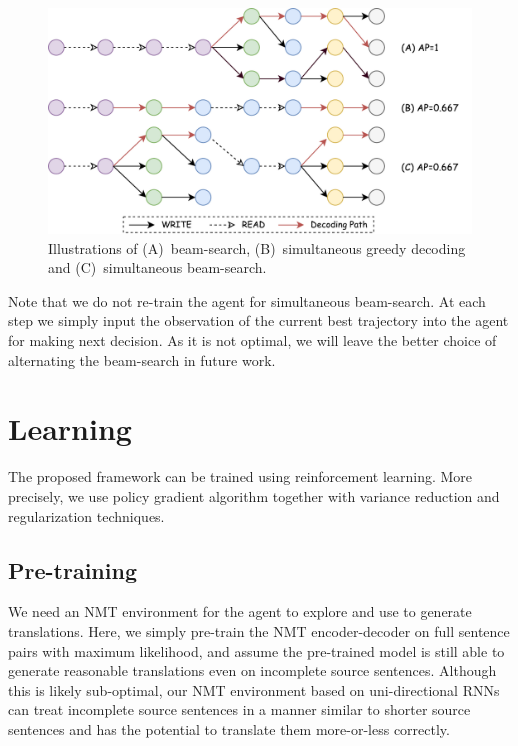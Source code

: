 \begin{figure}[t]
   	\centering
          	
          	\includegraphics[width=\linewidth]{figs/simultrans/decoding.pdf} 
          	\caption{\label{cp9.fig.beam} {Illustrations of (A)~beam-search, (B)~simultaneous greedy decoding and (C)~simultaneous beam-search.}} 
  
\end{figure} 

Note that we do not re-train the agent for simultaneous beam-search. At each step we simply input the observation of the current best trajectory into the agent for making next decision. As it is not optimal, we will leave the better choice of alternating the beam-search in future work.

\section{Learning}
\label{cp9.sec.optimization}
The proposed framework can be trained using reinforcement learning. More precisely, we use policy gradient algorithm together with variance reduction and regularization techniques.
\subsection{Pre-training} 
We need an NMT environment for the agent to explore and use to generate translations.
Here, we simply pre-train the NMT encoder-decoder on full sentence pairs with maximum likelihood, and assume the pre-trained model is still able to generate reasonable translations even on incomplete source sentences.
Although this is likely sub-optimal, our NMT environment based on uni-directional RNNs can treat incomplete source sentences in a manner similar to shorter source sentences and has the potential to translate them more-or-less correctly.%

